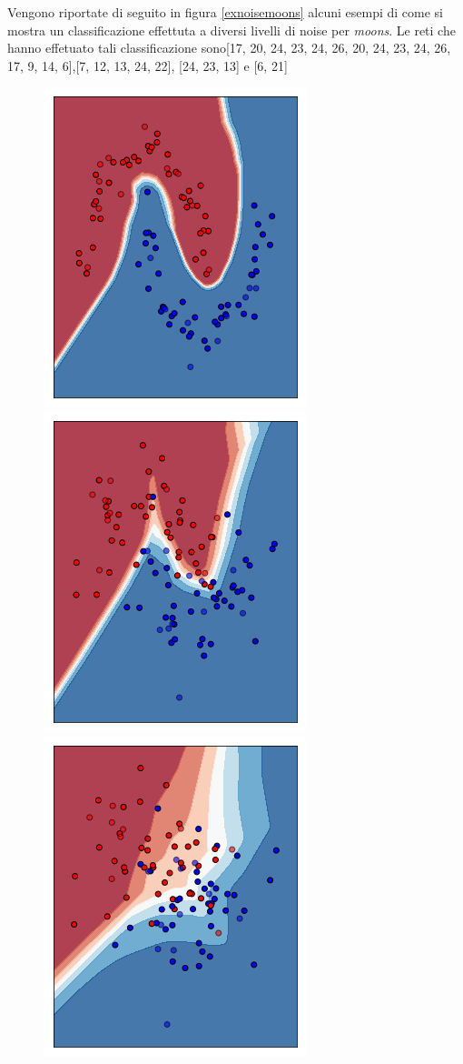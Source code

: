 \documentclass[12pt,a4paper]{report}
\begin{document}
Vengono riportate di seguito in figura \ref{exnoisemoons} alcuni esempi di come si mostra un classificazione effettuta a diversi livelli di noise per \textit{moons}.
Le reti che hanno effetuato tali classificazione sono[17, 20, 24, 23, 24, 26, 20, 24, 23, 24, 26, 17, 9, 14, 6],[7, 12, 13, 24, 22], [24, 23, 13] e [6, 21]

\begin{figure}[H]
\centering
 \includegraphics[scale = 0.5]{images/moons-noise0,1}
 \includegraphics[scale = 0.5]{images/moons-noise0,3}
 \includegraphics[scale = 0.5]{images/moons-noise0,6}

\end{figure}
\end{document}
